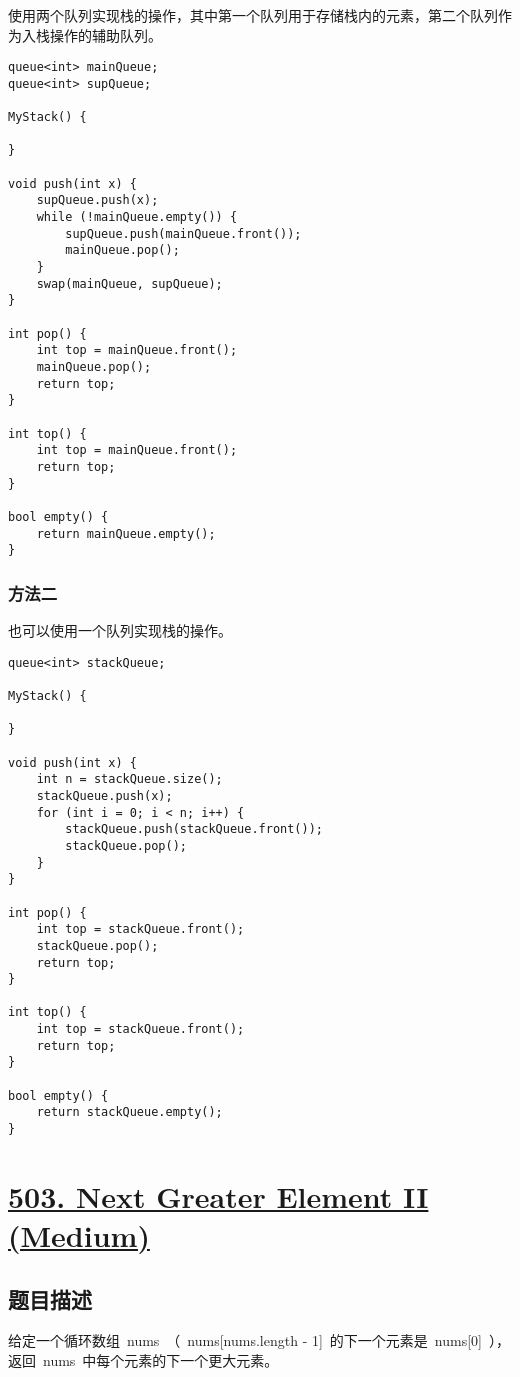 \documentclass[lang=cn,10pt]{elegantbook}
\begin{document}
使用两个队列实现栈的操作，其中第一个队列用于存储栈内的元素，第二个队列作为入栈操作的辅助队列。

\begin{lstlisting}
queue<int> mainQueue;
queue<int> supQueue;

MyStack() {
	
}

void push(int x) {
	supQueue.push(x);
	while (!mainQueue.empty()) {
		supQueue.push(mainQueue.front());
		mainQueue.pop();
	}
	swap(mainQueue, supQueue);
}

int pop() {
	int top = mainQueue.front();
	mainQueue.pop();
	return top;
}

int top() {
	int top = mainQueue.front();
	return top;
}

bool empty() {
	return mainQueue.empty();
}
\end{lstlisting}

\subsubsection*{方法二}

也可以使用一个队列实现栈的操作。

\begin{lstlisting}
queue<int> stackQueue;

MyStack() {
	
}

void push(int x) {
	int n = stackQueue.size();
	stackQueue.push(x);
	for (int i = 0; i < n; i++) {
		stackQueue.push(stackQueue.front());
		stackQueue.pop();
	}
}

int pop() {
	int top = stackQueue.front();
	stackQueue.pop();
	return top;
}

int top() {
	int top = stackQueue.front();
	return top;
}

bool empty() {
	return stackQueue.empty();
}
\end{lstlisting}

{\color{red}\section{\href{https://leetcode.cn/problems/next-greater-element-ii/}{503. Next Greater Element II (Medium)}}} \label{ch11.503}

\subsection*{题目描述}

给定一个循环数组 nums （ nums[nums.length - 1] 的下一个元素是 nums[0] ），返回 nums 中每个元素的下一个更大元素。
\end{document}
